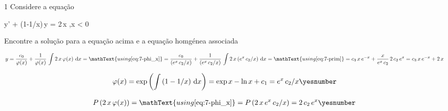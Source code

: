 \documentclass["AM3C-Slides_annotations.tex"]{subfiles}
\begin{document}
\begin{exampleBox}1{} %
  Considere a equação
  \begin{BM}
    y' + (1-1/x)\,y = 2\,x 
    ,\quad x < 0
  \end{BM}
  Encontre a solução para a equação acima e a equação homgénea associada

  \answer{}

  \begin{gather*}
    y
    = \frac{c_0}{\varphi(x)}
    + \frac{1  }{\varphi(x)}
    \,\int{2\,x\,\varphi(x)\,\odif{x}}
    = \mathText{using \eqref{eq:7-phi_x}}
    = \frac{c_0}{(e^{x}\,c_2/x)}
    + \frac{1  }{(e^{x}\,c_2/x)}
    \,\int{2\,x\,(e^{x}\,c_2/x)\,\odif{x}}
    = \mathText{using \eqref{eq:7-prim}}
    = c_3\,x\,e^{-x}
    + \frac{x  }{e^{x}\,c_2}
    \,2\,c_2\,e^{x}
    = c_3\,x\,e^{-x}
    + 2\,x
  \end{gather*}

  \begin{gather*}
    \varphi(x) 
    = \exp{\left(
      \int{(1-1/x)\,\odif{x}}
    \right)}
    = \exp{
      x
      - \ln{x}
      + c_1
    }
    = e^{x}\,c_2/x
    \yesnumber\label{eq:7-phi_x}
  \end{gather*}

  \begin{gather*}
    P\left(
      2\,x\,\varphi(x)
    \right)
    = \mathText{using \eqref{eq:7-phi_x}}
    = P\left(
      2\,x\,e^{x}\,c_2/x
    \right)
    = 2\,c_2\,e^{x}
    \yesnumber\label{eq:7-prim}
  \end{gather*}

\end{exampleBox}
\end{document}
